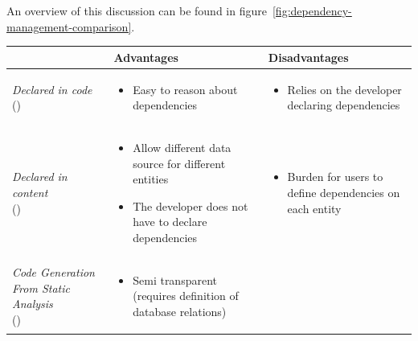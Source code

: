 An overview of this discussion can be found in figure~\ref{fig:dependency-management-comparison}.

\begin{table}[ht!]
  \footnotesize
  \centering
  \begin{tabular}{lll}
    \hline
    & \textbf{Advantages} & \textbf{Disadvantages} \\
    \hline
    {
      \parbox{3.5cm}{
        \emph{Declared in code} \\ (\cite{paper:cache-genie})
      }
    } & {
      \parbox{3.5cm}{
        \begin{itemize}[leftmargin=0.75em]
          \item Easy to reason about dependencies
        \end{itemize}
      }
    } & {
      \parbox{3.5cm}{
        \begin{itemize}[leftmargin=0.75em]
          \item Relies on the developer declaring dependencies
        \end{itemize}
      }
    } \\
    \hline
    {
      \parbox{3.5cm}{
        \emph{Declared in content} \\ (\cite{paper:ibm, paper:ibm-extended})
      }
    } & {
      \parbox{3.5cm}{
        \begin{itemize}[leftmargin=0.75em]
          \item Allow different data source for different entities
          \item The developer does not have to declare dependencies
        \end{itemize}
      }
    } & {
      \parbox{3.5cm}{
        \begin{itemize}[leftmargin=0.75em]
          \item Burden for users to define dependencies on each entity
        \end{itemize}
      }
    } \\
    \hline
    {
      \parbox{3.5cm}{
        \emph{Code Generation From Static Analysis} \\ (\cite{paper:deploy-time})
      }
    } & {
      \parbox{3.5cm}{
        \begin{itemize}[leftmargin=0.75em]
          \item Semi transparent  (requires definition of database relations)
        \end{itemize}
      }
    } & {
      \parbox{3.5cm}{
        \begin{itemize}[leftmargin=0.75em]

\end{itemize}}}
\end{tabular}
\end{table}
